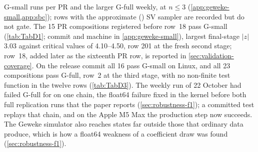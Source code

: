 G-small runs per PR and the larger G-full weekly, at $n \le 3$ (\cref{app:geweke-small,app:sbc});
rows with the approximate () SV sampler are recorded but do not gate. %
The 15 PR compositions registered before row~18 pass G-small (\cref{tab:TabD1}; commit and machine in \cref{app:geweke-small}), largest
final-stage $|z|$ 3.03 against critical values of 4.10--4.50, row 201 at the fresh second stage; %
row~18, added later as the sixteenth PR row, is reported in \cref{sec:validation-coverage}. %
On the release commit all 16 pass G-small on Linux, and all 23 compositions pass G-full, row~2
at the third stage, with no non-finite test function in the twelve  rows
(\cref{tab:TabD3}). %
The weekly run of 22 October had failed G-full for  on one chain, the float64
failure fixed in the kernel before both full replication runs that the paper reports
(\cref{sec:robustness-f1}); a committed test replays that chain, and on the Apple M5 Max the
production step now succeeds. %
The Geweke simulator also reaches states far outside those that ordinary data produce, which is how
a float64 weakness of a coefficient draw was found (\cref{sec:robustness-f1}).


